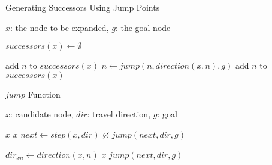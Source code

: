 \begin{algorithm}[t]
\caption{Generating Successors Using Jump Points}
\label{alg:successors}
\begin{algorithmic}[1]
\REQUIRE $x$: the node to be expanded, $g$: the goal node 

\STATE $successors(x) \leftarrow \emptyset$

\STATE add $n$ to $successors(x)$ 
\ELSE
\STATE $n \leftarrow jump(n, direction(x, n), g)$
\STATE add $n$ to $successors(x)$
\ENDIF
\ENDFOR

\end{algorithmic}
\end{algorithm}

\begin{algorithm}[b]
\caption{$jump$ Function}
\label{alg:findjump}
\begin{algorithmic}[1]
\REQUIRE $x$: candidate node, $dir$: travel direction, $g$: goal

	\RETURN $x$
\ENDIF
{}
	\RETURN $x$
\ENDIF
\STATE $next \leftarrow step(x, dir)$
	\RETURN $\varnothing$
\ENDIF
{}
	\RETURN $jump(next, dir, g)$
\ENDIF


	\STATE $dir_{xn} \leftarrow direction(x, n)$	
		\RETURN $x$
	\ENDIF
\ENDFOR
\RETURN $jump(next, dir, g)$
\end{algorithmic}
\end{algorithm}
